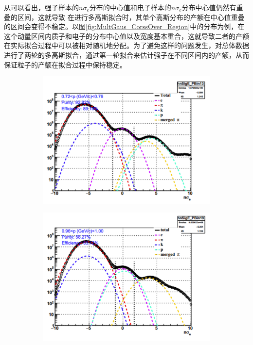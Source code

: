 从\label{fig:Mean_pureSample}可以看出，强子样本的$n\sigma_{e}$分布的中心值和电子样本的$n\sigma_{e}$分布中心值仍然有重叠的区间，这就导致
在进行多高斯拟合时，其单个高斯分布的产额在中心值重叠的区间会变得不稳定。以图\ref{fig:MultGaus_CorssOver_Region}中的分布为例，在这个动量区间内质子和电子的分布中心值以及宽度基本重合，这就导致二者的产额在实际拟合过程中可以被相对随机地分配。为了避免这样的问题发生，对总体数据进行了两轮的多高斯拟合，通过第一轮拟合来估计强子在不同区间内的产额，从而保证粒子的产额在拟合过程中保持稳定。
\begin{figure}[h!]
    \centering
    \begin{subfigure}[h!]{0.45\textwidth}
            \includegraphics[width=\textwidth]{figures/Chapter4/MultGaus_good.png}
            \caption{}
            \label{fig:MultGaus_good}
    \end{subfigure}
    \begin{subfigure}[h!]{0.45\textwidth}
            \includegraphics[width=\textwidth]{figures/Chapter4/MultGaus_CorssOver_Region.png}

\end{subfigure}
\end{figure}
